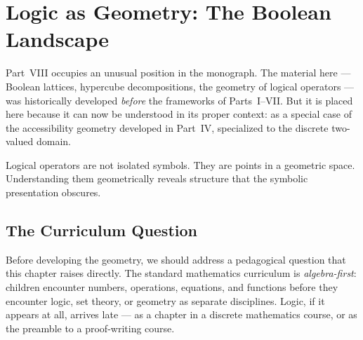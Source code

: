 
\chapter{Logic as Geometry: The Boolean Landscape}



Part~VIII occupies an unusual position in the monograph. The material
here — Boolean lattices, hypercube decompositions, the geometry of
logical operators — was historically developed \emph{before} the
frameworks of Parts~I–VII. But it is placed here because it can now
be understood in its proper context: as a special case of the
accessibility geometry developed in Part~IV, specialized to the
discrete two-valued domain.

Logical operators are not isolated symbols. They are points in a
geometric space. Understanding them geometrically reveals structure
that the symbolic presentation obscures.

\section{The Curriculum Question}

Before developing the geometry, we should address a pedagogical
question that this chapter raises directly. The standard mathematics
curriculum is \emph{algebra-first}: children encounter numbers,
operations, equations, and functions before they encounter logic,
set theory, or geometry as separate disciplines. Logic, if it appears
at all, arrives late — as a chapter in a discrete mathematics course,
or as the preamble to a proof-writing course.

